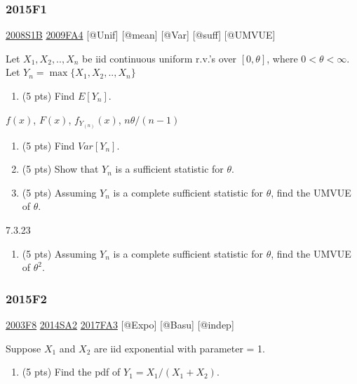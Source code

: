 \documentclass[6pt,Portrait]{article}
\providecommand{\tightlist}{%
  \setlength{\itemsep}{0pt}\setlength{\parskip}{0pt}}
\begin{document}
\hypertarget{f1-5}{%
\subsubsection{2015F1}\label{f1-5}}

\protect\hyperlink{s1b}{2008S1B} \protect\hyperlink{fa4}{2009FA4}
{[}@Unif{]} {[}@mean{]} {[}@Var{]} {[}@suff{]} {[}@UMVUE{]}

Let \(X_1,X_2,..,X_{n}\) be iid continuous uniform r.v.'s over
\([0,\theta]\), where \(0 <\theta<\infty\). Let
\(Y_{n}=\max\{X_1,X_2,..,X_{n}\}\)

\begin{enumerate}
\def\labelenumi{(\alph{enumi})}
\tightlist
\item
  (5 pts) Find \(E[Y_n]\).
\end{enumerate}

\(f(x)\), \(F(x)\), \(f_{Y_{(n)}}(x)\), \(n\theta/(n-1)\)

\begin{enumerate}
\def\labelenumi{(\alph{enumi})}
\setcounter{enumi}{1}
\item
  (5 pts) Find \(Var[Y_n]\).
\item
  (5 pts) Show that \(Y_n\) is a sufficient statistic for \(\theta\).
\item
  (5 pts) Assuming \(Y_n\) is a complete sufficient statistic for
  \(\theta\), find the UMVUE of \(\theta\).
\end{enumerate}

7.3.23

\begin{enumerate}
\def\labelenumi{(\alph{enumi})}
\setcounter{enumi}{4}
\tightlist
\item
  (5 pts) Assuming \(Y_n\) is a complete sufficient statistic for
  \(\theta\), find the UMVUE of \(\theta^2\).
\end{enumerate}

\hypertarget{f2-5}{%
\subsubsection{2015F2}\label{f2-5}}

\protect\hyperlink{f8-1}{2003F8} \protect\hyperlink{sa2-2}{2014SA2}
\protect\hyperlink{fa3-3}{2017FA3} {[}@Expo{]} {[}@Basu{]} {[}@indep{]}

Suppose \(X_1\) and \(X_2\) are iid exponential with parameter = 1.

\begin{enumerate}
\def\labelenumi{(\alph{enumi})}
\tightlist
\item
  (5 pts) Find the pdf of \(Y_1=X_1/(X_1+X_2)\).
\end{enumerate}
\end{document}
